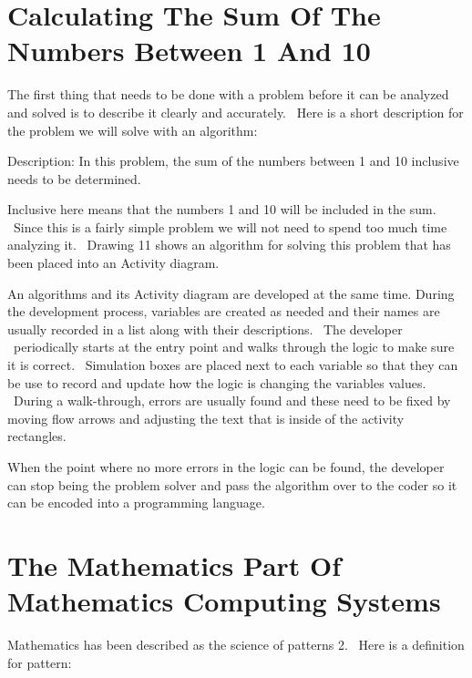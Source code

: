 \documentclass[12pt,twoside]{book}
\begin{document}
\section[Calculating The Sum Of The Numbers Between 1 And 10]{ Calculating The Sum Of The Numbers Between 1 And 10}

The first thing that needs to be done with a problem before it can be analyzed and solved is to describe it clearly and accurately. \ Here is a short description for the problem we will solve with an algorithm:


\bigskip

Description: In this problem, the sum of the numbers between 1 and 10 inclusive needs to be determined. 

\bigskip

Inclusive here means that the numbers 1 and 10 will be included in the sum. \ Since this is a fairly simple problem we will not need to spend too much time analyzing it. \ Drawing 11 shows an algorithm for solving this problem that has been placed into an Activity diagram. 

\bigskip


\bigskip

An algorithms and its Activity diagram are developed at the same time. During the development process, variables are created as needed and their names are usually recorded in a list along with their descriptions. \ The developer \ periodically starts at the entry point and walks through the logic to make sure it is correct. \ Simulation boxes are placed next to each variable so that they can be use to record and update how the logic is changing the variable{\textquotesingle}s values. \ During a walk{}-through, errors are usually found and these need to be fixed by moving flow arrows and adjusting the text that is inside of the activity rectangles. 

\bigskip

When the point where no more errors in the logic can be found, the developer can stop being the problem solver and pass the algorithm over to the coder so it can be encoded into a programming language.

\section[The Mathematics Part Of Mathematics Computing Systems]{The Mathematics Part Of Mathematics Computing Systems}

Mathematics has been described as the {\textquotedbl}science of patterns{\textquotedbl} 2. \ Here is a definition for pattern: 
\end{document}
